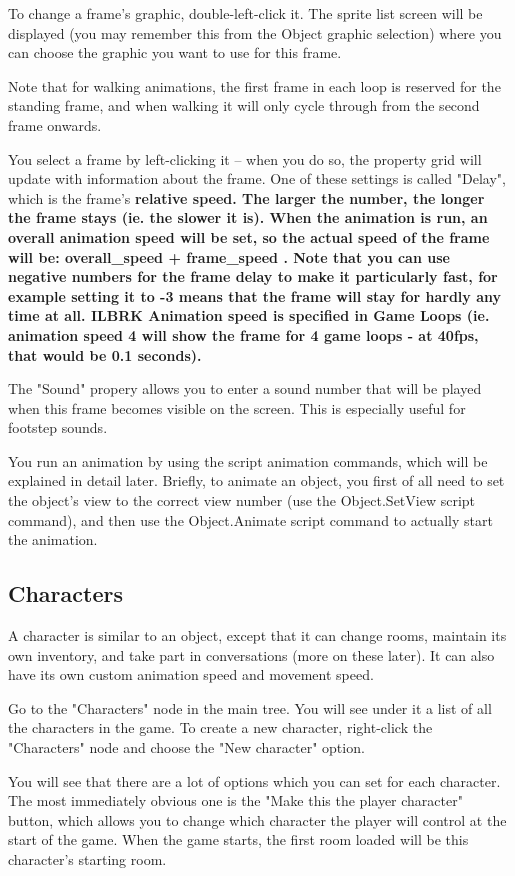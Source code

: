 To change a frame's graphic, double-left-click it. The sprite list screen
will be displayed (you may remember this from the Object graphic selection)
where you can choose the graphic you want to use for this frame.

Note that for walking animations, the first frame in each loop is reserved for
the standing frame, and when walking it will only cycle through from the second
frame onwards.

You select a frame by left-clicking it -- when you do so, the property grid
will update with information about the frame. One of these settings is
called "Delay", which is the frame's \bf{relative} speed. The larger the number,
the longer the frame stays (ie. the slower it is). When the animation is run,
an overall animation speed will be set, so the actual speed of the frame
will be:  overall_speed + frame_speed  . Note that you can use negative
numbers for the frame delay to make it particularly fast, for example setting
it to -3 means that the frame will stay for hardly any time at all. ILBRK
Animation speed is specified in Game Loops (ie. animation speed 4 will show the
frame for 4 game loops - at 40fps, that would be 0.1 seconds).

The "Sound" propery allows you to enter a sound number that will be played
when this frame becomes visible on the screen.
This is especially useful for footstep sounds.

You run an animation by using the script animation commands, which will
be explained in detail later. Briefly, to animate an object, you first
of all need to set the object's view to the correct view number (use
the Object.SetView script command), and then use the Object.Animate
script command to actually start the animation.

\subsection{Characters}%

A character is similar to an object, except that it can change rooms,
maintain its own inventory, and take part in conversations (more on
these later). It can also have its own custom animation speed and movement
speed.

Go to the "Characters" node in the main tree. You will see under it a
list of all the characters in the game.
To create a new character, right-click the "Characters" node and
choose the "New character" option.

You will see that there are a lot of options which you can set for each
character. The most immediately obvious one is the "Make this the player character"
button, which allows you to change which character the player will control
at the start of the game.
When the game starts, the first room loaded will be this character's
starting room.

